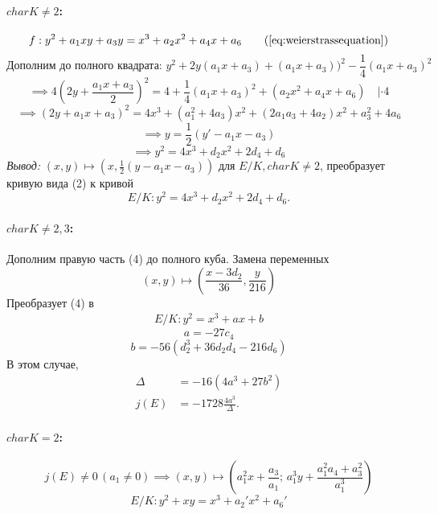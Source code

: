 \documentclass[12pt]{article}
\theoremstyle{definition}
\theoremstyle{definition}
\theoremstyle{definition}
\begin{document}
            \paragraph{$char K \neq 2$:}
            \begin{equation*}
                f: y^2+a_1xy + a_3y = x^3 + a_2x^2 + a_4x + a_6 \tag{\ref{eq:weierstrassequation}}
            \end{equation*}
            \[
            \text{Дополним до полного квадрата: } y^2 + 2y(a_1x+a_3)+(a_1x+a_3))^2- \frac{1}{4}(a_1x+a_3)^2
            \]
            \[
            \implies 4(2y + \frac{a_1x+a_3}{2})^2 = 4 + \frac{1}{4}(a_1x+a_3)^2 + (a_2x^2 + a_4x + a_6) \quad| \cdot 4
            \]
            \[
            \implies (2y + a_1x+a_3)^2 = 4x^3 + (a_1^2 + 4a_3)x^2 + (2a_1a_3 + 4a_2)x^2 + a_3^2 + 4a_6
            \]
            \[
            \implies y = \frac{1}{2}(y' - a_1x - a_3)
            \]
            \[
            \implies y^2 = 4x^3 + d_2x^2 + 2d_4 + d_6
            \]
            \textit{Вывод: } $(x, y)\mapsto(x, \frac{1}{2}(y-a_1x-a_3))$ для $E/K, char K \neq 2$, преобразует кривую вида (2) к кривой
            \begin{equation}
                E/K: y^2 = 4x^3 + d_2x^2 + 2d_4 + d_6.
            \end{equation}
            
            \paragraph{$char K \neq 2, 3$:} 
            Дополним правую часть (4) до полного куба. Замена переменных
            \[
            (x, y) \mapsto (\frac{x-3d_2}{36}, \frac{y}{216})
            \]
            Преобразует (4) в 
            \begin{align}
                E/K: y^2 = x^3 + ax + b
            \end{align}
            \[
                a = -27c_4
            \]
            \[
                b = -56(d_2^3 + 36d_2d_4 - 216d_6) 
            \]
            В этом случае, 
            \begin{align*}
                \Delta &= -16(4a^3 + 27b^2) \\ \nonumber
                j(E) &= -1728 \frac{4a^3}{\Delta}. \nonumber
            \end{align*}
                  
            \paragraph{$char K = 2$:} 
            \[
            j(E)\neq0 \, (a_1\neq0) \implies (x, y) \mapsto (a_1^2x+\frac{a_3}{a_1}; \, a_1^3y + \frac{a_1^2a_4+a_3^2}{a_1^3})
            \]
            \begin{equation}
                E/K: y^2+xy=x^3+a_2'x^2+a_6'
            \end{equation}
            
\end{document}
